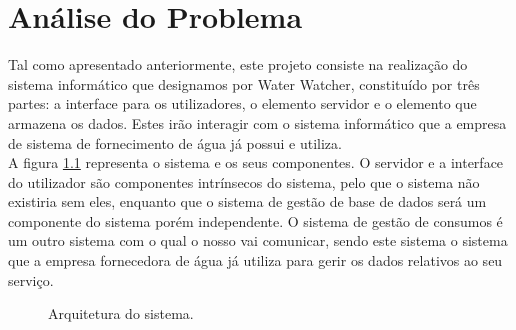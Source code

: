 \chapter{Análise do Problema} \label{cap:analise}

Tal como apresentado anteriormente, este projeto consiste na realização do sistema informático que designamos por Water Watcher, constituído por três partes: a interface para os utilizadores, o elemento servidor e o elemento que armazena os dados. Estes irão interagir com o sistema informático que a empresa de sistema de fornecimento de água já possui e utiliza.\\
A figura \ref{fig:modelo} representa o sistema e os seus componentes. O servidor e a interface do utilizador são componentes intrínsecos do sistema, pelo que o sistema não existiria sem eles, enquanto que o sistema de gestão de base de dados será um componente do sistema porém independente. O sistema de gestão de consumos é um outro sistema com o qual o nosso vai comunicar, sendo este sistema o sistema que a empresa fornecedora de água já utiliza para gerir os dados relativos ao seu serviço.

\vspace{1cm} %

\begin{figure}[ht!]
\centering
{}
\caption{Arquitetura do sistema.}
\label{fig:modelo}
\end{figure}

